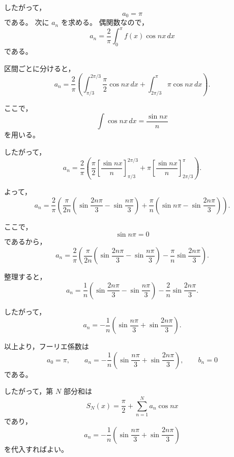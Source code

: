 \begin{solution}
	したがって，
	\[
	a_0=\pi
	\]
	である。
	次に \(a_n\) を求める。
	偶関数なので，
	\[
	a_n
	=
	\frac{2}{\pi}\int_0^\pi f(x)\cos nx\,dx
	\]
	である。
	
	区間ごとに分けると，
	\[
	a_n
	=
	\frac{2}{\pi}
	\left(
	\int_{\pi/3}^{2\pi/3}
	\frac{\pi}{2}\cos nx\,dx
	+
	\int_{2\pi/3}^{\pi}
	\pi\cos nx\,dx
	\right).
	\]
	
	ここで，
	\[
	\int \cos nx\,dx
	=
	\frac{\sin nx}{n}
	\]
	を用いる。
	
	したがって，
	\[
	a_n
	=
	\frac{2}{\pi}
	\left(
	\frac{\pi}{2}
	\left[
	\frac{\sin nx}{n}
	\right]_{\pi/3}^{2\pi/3}
	+
	\pi
	\left[
	\frac{\sin nx}{n}
	\right]_{2\pi/3}^{\pi}
	\right).
	\]
	
	よって，
	\[
	a_n
	=
	\frac{2}{\pi}
	\left(
	\frac{\pi}{2n}
	\left(
	\sin\frac{2n\pi}{3}
	-
	\sin\frac{n\pi}{3}
	\right)
	+
	\frac{\pi}{n}
	\left(
	\sin n\pi
	-
	\sin\frac{2n\pi}{3}
	\right)
	\right).
	\]
	
	ここで，
	\[
	\sin n\pi=0
	\]
	であるから，
	\[
	a_n
	=
	\frac{2}{\pi}
	\left(
	\frac{\pi}{2n}
	\left(
	\sin\frac{2n\pi}{3}
	-
	\sin\frac{n\pi}{3}
	\right)
	-
	\frac{\pi}{n}
	\sin\frac{2n\pi}{3}
	\right).
	\]
	
	整理すると，
	\[
	a_n
	=
	\frac{1}{n}
	\left(
	\sin\frac{2n\pi}{3}
	-
	\sin\frac{n\pi}{3}
	\right)
	-
	\frac{2}{n}
	\sin\frac{2n\pi}{3}.
	\]
	
	したがって，
	\[
	a_n
	=
	-\frac{1}{n}
	\left(
	\sin\frac{n\pi}{3}
	+
	\sin\frac{2n\pi}{3}
	\right).
	\]
	
	以上より，フーリエ係数は
	\[
	\boxed{
		a_0=\pi,
		\qquad
		a_n=
		-\frac{1}{n}
		\left(
		\sin\frac{n\pi}{3}
		+
		\sin\frac{2n\pi}{3}
		\right),
		\qquad
		b_n=0
	}
	\]
	である。
	
	したがって，第 \(N\) 部分和は
	\[
	S_N(x)
	=
	\frac{\pi}{2}
	+
	\sum_{n=1}^{N}
	a_n\cos nx
	\]
	であり，
	\[
	a_n=
	-\frac{1}{n}
	\left(
	\sin\frac{n\pi}{3}
	+
	\sin\frac{2n\pi}{3}
	\right)
	\]
	を代入すればよい。
	\end{solution}
